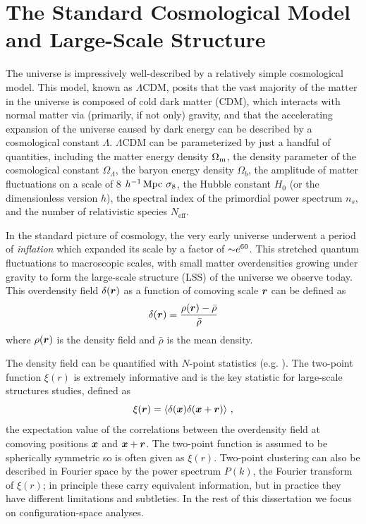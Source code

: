 \graphicspath{{figures/figures_intro/}}


\section{The Standard Cosmological Model and Large-Scale Structure}

The universe is impressively well-described by a relatively simple cosmological model.
This model, known as $\Lambda$CDM, posits that the vast majority of the matter in the universe is composed of cold dark matter (CDM), which interacts with normal matter via (primarily, if not only) gravity, and that the accelerating expansion of the universe caused by dark energy can be described by a cosmological constant $\Lambda$.
$\Lambda$CDM can be parameterized by just a handful of quantities, including the matter energy density $\Omega_\mathrm{m}$, the density parameter of the cosmological constant $\Omega_\Lambda$, the baryon energy density $\Omega_{b}$, the amplitude of matter fluctuations on a scale of 8 $h^{-1}\,\mathrm{Mpc}$ $\sigma_\mathrm{8}$, the Hubble constant $H_0$ (or the dimensionless version $h$), the spectral index of the primordial power spectrum $n_{s}$, and the number of relativistic species $N_{\mathrm{eff}}$. 

In the standard picture of cosmology, the very early universe underwent a period of \emph{inflation} which expanded its scale by a factor of $\mathord{\sim} e^{60}$.
This stretched quantum fluctuations to macroscopic scales, with small matter overdensities growing under gravity to form the large-scale structure (LSS) of the universe we observe today.
This overdensity field $\delta(\bm{r})$ as a function of comoving scale $\bm{r}$ can be defined as
\begin{equation}
    \delta(\bm{r}) = \frac{\rho(\bm{r}) - \bar{\rho}}{\bar{\rho}}
\end{equation}
where $\rho(\bm{r})$ is the density field and $\bar{\rho}$ is the mean density.

The density field can be quantified with $N$-point statistics (e.g. \citealt{peebles_large-scale_1980}).
The two-point function $\xi(r)$ is extremely informative and is the key statistic for large-scale structures studies, defined as
\begin{equation}
    \label{eq:xi}
    \xi(\bm{r}) = \langle \delta(\bm{x}) \delta(\bm{x} + \bm{r}) \rangle ~,
\end{equation}
the expectation value of the correlations between the overdensity field at comoving positions $\bm{x}$ and $\bm{x}+\bm{r}$.
The two-point function is assumed to be spherically symmetric so is often given as $\xi(r)$.
Two-point clustering can also be described in Fourier space by the power spectrum $P(k)$, the Fourier transform of $\xi(r)$; in principle these carry equivalent information, but in practice they have different limitations and subtleties.
In the rest of this dissertation we focus on configuration-space analyses.

